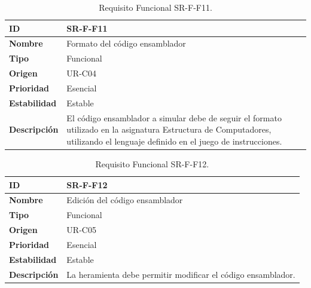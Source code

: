 \begin{center}
\begin{table}[htbp]
\centering
\begin{tabular}{@{}p{2.5cm} p{9cm}@{}} 
\toprule
\textbf{ID} 				& SR-F-F11 \\
\midrule
\textbf{Nombre} 			& Formato del código ensamblador\\
\midrule
\textbf{Tipo} 			& Funcional \\
\midrule
\textbf{Origen} 			& UR-C04 \\
\midrule
\textbf{Prioridad}		& Esencial \\
\midrule
\textbf{Estabilidad} 		& Estable \\
\midrule
\textbf{Descripción} 	& El código ensamblador a simular debe de seguir el formato utilizado en la asignatura Estructura de Computadores, utilizando el lenguaje definido en el juego de instrucciones.\\
\bottomrule
\end{tabular}
\caption{Requisito Funcional SR-F-F11.}
\label{tab:srff11}
\end{table}
\end{center}

\begin{center}
\begin{table}[htbp]
\centering
\begin{tabular}{@{}p{2.5cm} p{9cm}@{}} 
\toprule
\textbf{ID} 				& SR-F-F12 \\
\midrule
\textbf{Nombre} 			& Edición del código ensamblador\\
\midrule
\textbf{Tipo} 			& Funcional \\
\midrule
\textbf{Origen} 			& UR-C05 \\
\midrule
\textbf{Prioridad}		& Esencial \\
\midrule
\textbf{Estabilidad} 		& Estable \\
\midrule
\textbf{Descripción} 	& La heramienta debe permitir modificar el código ensamblador. \\
\bottomrule
\end{tabular}
\caption{Requisito Funcional SR-F-F12.}
\label{tab:srff12}
\end{table}
\end{center}

